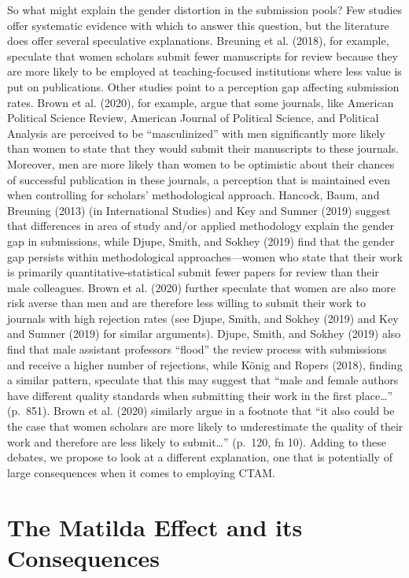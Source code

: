 \documentclass[
]{ccr}
\begin{document}
So what might explain the gender distortion in the submission pools? Few
studies offer systematic evidence with which to answer this question,
but the literature does offer several speculative explanations. Breuning
et al. (2018), for example, speculate that women scholars submit fewer
manuscripts for review because they are more likely to be employed at
teaching-focused institutions where less value is put on publications.
Other studies point to a perception gap affecting submission rates.
Brown et al. (2020), for example, argue that some journals, like
American Political Science Review, American Journal of Political
Science, and Political Analysis are perceived to be ``masculinized''
with men significantly more likely than women to state that they would
submit their manuscripts to these journals. Moreover, men are more
likely than women to be optimistic about their chances of successful
publication in these journals, a perception that is maintained even when
controlling for scholars' methodological approach. Hancock, Baum, and
Breuning (2013) (in International Studies) and Key and Sumner (2019)
suggest that differences in area of study and/or applied methodology
explain the gender gap in submissions, while Djupe, Smith, and Sokhey
(2019) find that the gender gap persists within methodological
approaches---women who state that their work is primarily
quantitative-statistical submit fewer papers for review than their male
colleagues. Brown et al. (2020) further speculate that women are also
more risk averse than men and are therefore less willing to submit their
work to journals with high rejection rates (see Djupe, Smith, and Sokhey
(2019) and Key and Sumner (2019) for similar arguments). Djupe, Smith,
and Sokhey (2019) also find that male assistant professors ``flood'' the
review process with submissions and receive a higher number of
rejections, while König and Ropers (2018), finding a similar pattern,
speculate that this may suggest that ``male and female authors have
different quality standards when submitting their work in the first
place\ldots{}'' (p.~851). Brown et al. (2020) similarly argue in a
footnote that ``it also could be the case that women scholars are more
likely to underestimate the quality of their work and therefore are less
likely to submit\ldots{}'' (p.~120, fn 10). Adding to these debates, we
propose to look at a different explanation, one that is potentially of
large consequences when it comes to employing CTAM.

\hypertarget{the-matilda-effect-and-its-consequences}{%
\section{The Matilda Effect and its
Consequences}\label{the-matilda-effect-and-its-consequences}}
\end{document}
